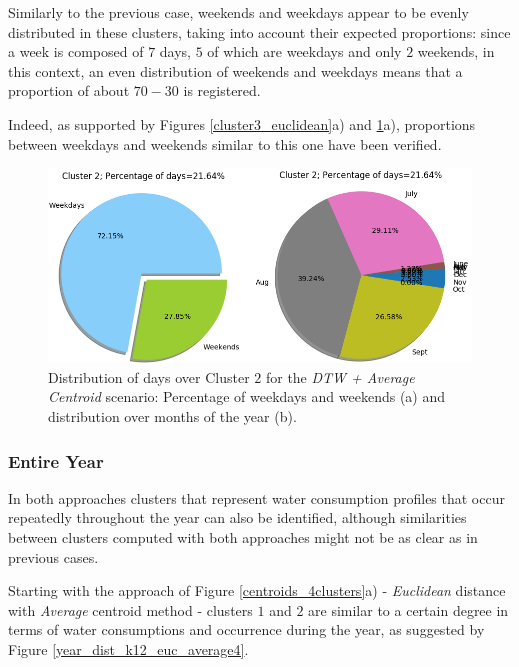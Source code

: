 \documentclass[9pt,journal,compsoc]{IEEEtran}
\begin{document}
Similarly to the previous case, weekends and weekdays appear to be evenly distributed in these clusters, taking into account their expected proportions: since a week is composed of $7$ days, $5$ of which are weekdays and only $2$ weekends, in this context, an even distribution of weekends and weekdays means that a proportion of about $70-30$ is registered.

Indeed, as supported by Figures \ref{cluster3_euclidean}a) and \ref{cluster2_raw}a), proportions between weekdays and weekends similar to this one have been verified.

\begin{figure}
	\centering
	\includegraphics[scale=0.4]{images/percent_week_months_dtw_average_cluster2_k4.png}
	\caption{Distribution of days over Cluster $2$ for the \emph{DTW + Average Centroid} scenario: Percentage of weekdays and weekends (a) and distribution over months of the year (b).}
	\label{cluster2_raw}
\end{figure}

\subsubsection{Entire Year}

In both approaches clusters that represent water consumption profiles that occur repeatedly throughout the year can also be identified, although similarities between clusters computed with both approaches might not be as clear as in previous cases.

Starting with the approach of Figure \ref{centroids_4clusters}a) - \emph{Euclidean} distance with \emph{Average} centroid method - clusters $1$ and $2$ are similar to a certain degree in terms of water consumptions and occurrence during the year, as suggested by Figure \ref{year_dist_k12_euc_average4}.
\end{document}
